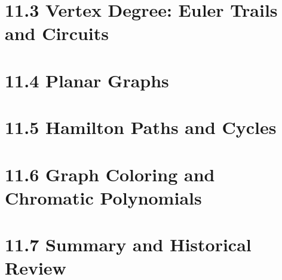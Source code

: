 \documentclass[a4paper]{article}
\begin{document}
\begin{center}
\end{center}

\section*{11.3 Vertex Degree: Euler Trails and Circuits}
\section*{11.4 Planar Graphs}
\section*{11.5 Hamilton Paths and Cycles}
\section*{11.6 Graph Coloring and Chromatic Polynomials}
\section*{11.7 Summary and Historical Review}
\end{document}
